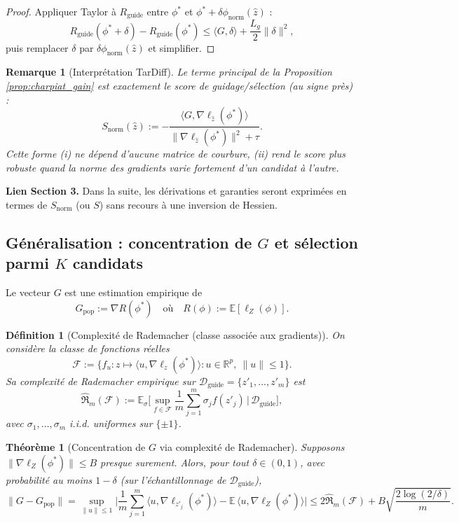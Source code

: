 \documentclass[11pt]{article}
\newtheorem{definition}{Définition}
\newtheorem{theorem}{Théorème}
\newtheorem{remark}{Remarque}
\begin{document}
\begin{proof}
Appliquer Taylor à $R_{\text{guide}}$ entre $\phi^*$ et $\phi^*+\delta\phi_{\text{norm}}(\hat z)$ :
\[
R_{\text{guide}}(\phi^*+\delta)-R_{\text{guide}}(\phi^*) \le \langle G,\delta\rangle + \frac{L_g}{2}\|\delta\|^2,
\]
puis remplacer $\delta$ par $\delta\phi_{\text{norm}}(\hat z)$ et simplifier.
\end{proof}

\begin{remark}[Interprétation TarDiff]
Le terme principal de la Proposition \ref{prop:charpiat_gain} est exactement le score de guidage/sélection (au signe près) :
\[
S_{\text{norm}}(\hat z) := -\frac{\langle G,\nabla \ell_{\hat z}(\phi^*)\rangle}{\|\nabla \ell_{\hat z}(\phi^*)\|^2+\tau}.
\]
Cette forme (i) ne dépend d'aucune matrice de courbure, (ii) rend le score plus robuste quand la norme des gradients varie fortement d'un candidat à l'autre.
\end{remark}

\noindent\textbf{Lien Section 3.}
Dans la suite, les dérivations et garanties seront exprimées en termes de $S_{\text{norm}}$ (ou $S$) sans recours à une inversion de Hessien.

\subsection{Généralisation : concentration de $G$ et sélection parmi $K$ candidats}

Le vecteur $G$ est une estimation empirique de
\[
G_{\text{pop}} := \nabla R(\phi^*) \quad \text{où} \quad R(\phi):=\mathbb E[\ell_Z(\phi)].
\]

\begin{definition}[Complexité de Rademacher (classe associée aux gradients)]
\label{def:rad_grad}
On considère la classe de fonctions réelles
\[
\mathcal F := \big\{ f_u:z\mapsto \langle u,\nabla \ell_z(\phi^*)\rangle : u\in\mathbb R^p,\ \|u\|\le 1\big\}.
\]
Sa complexité de Rademacher empirique sur $\mathcal D_{\text{guide}}=\{z'_1,\dots,z'_m\}$ est
\[
\widehat{\mathfrak R}_m(\mathcal F)
:=
\mathbb E_{\sigma}\Big[\sup_{f\in\mathcal F}\frac1m\sum_{j=1}^m \sigma_j f(z'_j)\,\Big|\,\mathcal D_{\text{guide}}\Big],
\]
avec $\sigma_1,\dots,\sigma_m$ i.i.d. uniformes sur $\{\pm1\}$.
\end{definition}

\begin{theorem}[Concentration de $G$ via complexité de Rademacher]
\label{thm:conc}
Supposons $\|\nabla \ell_Z(\phi^*)\|\le B$ presque surement.
Alors, pour tout $\delta\in(0,1)$, avec probabilité au moins $1-\delta$ (sur l'échantillonnage de $\mathcal D_{\text{guide}}$),
\[
\|G-G_{\text{pop}}\|
=
\sup_{\|u\|\le 1}\Big|\frac1m\sum_{j=1}^m \langle u,\nabla \ell_{z'_j}(\phi^*)\rangle - \mathbb E\,\langle u,\nabla \ell_Z(\phi^*)\rangle\Big|
\le
2\widehat{\mathfrak R}_m(\mathcal F)
+
B\sqrt{\frac{2\log(2/\delta)}{m}}.
\]
\end{theorem}
\end{document}
